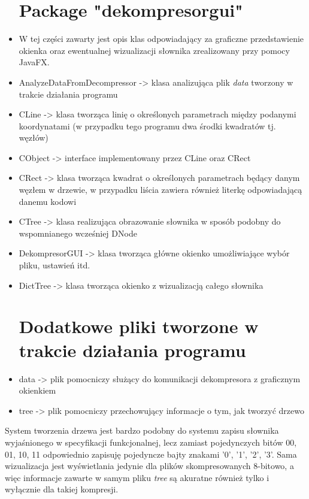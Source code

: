 \documentclass[]{article}
\begin{document}
\begin{itemize}
\section{Package "dekompresorgui"}\label{header-n231}
\item[]
W tej części zawarty jest opis klas odpowiadający za graficzne przedstawienie okienka oraz ewentualnej wizualizacji słownika zrealizowany przy pomocy JavaFX.
\item
AnalyzeDataFromDecompressor -> klasa analizująca plik \textit{data} tworzony w trakcie działania programu
\item
CLine -> klasa tworząca linię o określonych parametrach między podanymi koordynatami (w przypadku tego programu dwa środki kwadratów tj. węzłów)
\item
CObject -> interface implementowany przez CLine oraz CRect
\item
CRect -> klasa tworząca kwadrat o określonych parametrach będący danym węzłem w drzewie, w przypadku liścia zawiera również literkę odpowiadającą danemu kodowi
\item
CTree -> klasa realizująca obrazowanie słownika w sposób podobny do wspomnianego wcześniej DNode
\item
DekompresorGUI -> klasa tworząca główne okienko umożliwiające wybór pliku, ustawień itd.
\item
DictTree -> klasa tworząca okienko z wizualizacją całego słownika
\section{Dodatkowe pliki tworzone w trakcie działania programu}\label{header-n231}
\item
data -> plik pomocniczy służący do komunikacji dekompresora z graficznym okienkiem
\item
tree -> plik pomocniczy przechowujący informacje o tym, jak tworzyć drzewo
\end{itemize}

System tworzenia drzewa jest bardzo podobny do systemu zapisu słownika wyjaśnionego w specyfikacji funkcjonalnej, lecz zamiast pojedynczych bitów 00, 01, 10, 11 odpowiednio zapisuję pojedyncze bajty znakami '0', '1', '2', '3'. Sama wizualizacja jest wyświetlania jedynie dla plików skompresowanych 8-bitowo, a więc informacje zawarte w samym pliku \textit{tree} są akuratne również tylko i wyłącznie dla takiej kompresji.
\end{document}
